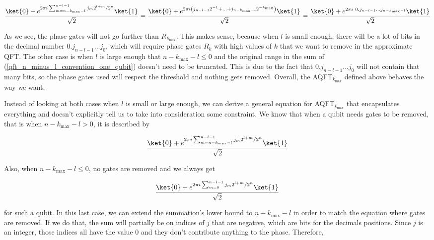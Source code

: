 \begin{equation*}
    \frac{\ket{0} + e^{2\pi i \sum_{m=n-k_{\text{max}}-l}^{n-l-1} j_m2^{l+m}/2^n}\ket{1}}{\sqrt{2}} = \frac{\ket{0} + e^{2\pi i \left(j_{n-l-1}2^{-1} + ... + j_{n-k_{\text{max}}-l}2^{-k_{\text{max}}}\right)}\ket{1}}{\sqrt{2}} = \frac{\ket{0} + e^{2\pi i \ 0\textbf{.}j_{n-l-1}...j_{n-k_{\text{max}}-l}}\ket{1}}{\sqrt{2}}
\end{equation*}

As we see, the phase gates will not go further than $R_{k_{\text{max}}}$. This makes sense, because when $l$ is small enough, there will be a lot of bits in the decimal number $0\textbf{.}j_{n-l-1}...j_0$, which will require phase gates $R_k$ with high values of $k$ that we want to remove in the approximate QFT. The other case is when $l$ is large enough that $n-k_{\text{max}}-l \leq 0$ and the original range in the sum of (\ref{qft_n_minus_l_convention_one_qubit}) doesn't need to be truncated. This is due to the fact that $0\textbf{.}j_{n-l-1}...j_0$ will not contain that many bits, so the phase gates used will respect the threshold and nothing gets removed. Overall, the AQFT$_{k_{\text{max}}}$ defined above behaves the way we want.

Instead of looking at both cases when $l$ is small or large enough, we can derive a general equation for AQFT$_{k_\text{max}}$ that encapsulates everything and doesn't explicitly tell us to take into consideration some constraint. We know that when a qubit needs gates to be removed, that is when $n-k_{\text{max}}-l > 0$, it is described by 

\begin{equation*}
    \frac{\ket{0} + e^{2\pi i \sum_{m=n-k_{\text{max}}-l}^{n-l-1} j_m2^{l+m}/2^n}\ket{1}}{\sqrt{2}}
\end{equation*}

Also, when $n-k_{\text{max}}-l \leq 0$, no gates are removed and we always get

\begin{equation*}
    \frac{\ket{0} + e^{2\pi i \sum_{m=0}^{n-l-1} j_m2^{l+m}/2^n}\ket{1}}{\sqrt{2}} 
\end{equation*}

for such a qubit. In this last case, we can extend the summation's lower bound to $n-k_{\text{max}}-l$ in order to match the equation where gates are removed. If we do that, the sum will partially be on indices of $j$ that are negative, which are bits for the decimals positions. Since $j$ is an integer, those indices all have the value 0 and they don't contribute anything to the phase. Therefore,


